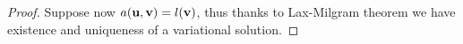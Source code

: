 \begin{proof}
	Suppose now $a({\bf u},{\bf v}) = l({\bf v})$, thus thanks to Lax-Milgram theorem we have existence and uniqueness of a variational solution.
\end{proof}

